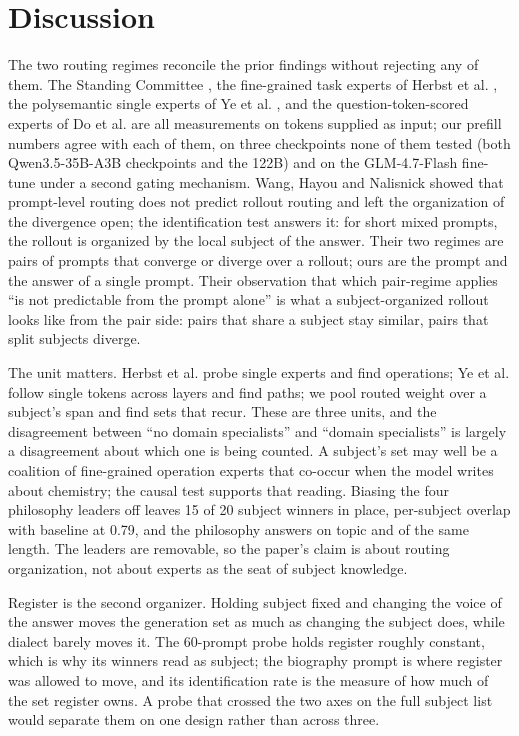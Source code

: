 \documentclass[10pt,twocolumn]{article}
\begin{document}
\section{Discussion}
\label{sec:discussion}

The two routing regimes reconcile the prior findings without rejecting any of them. The Standing Committee \citep{wang2026standingcommittee}, the fine-grained task experts of Herbst et al. \citep{herbst2026expertstrikesback}, the polysemantic single experts of Ye et al. \citep{ye2026polysemantic}, and the question-token-scored experts of Do et al. \citep{do2026domainexperts} are all measurements on tokens supplied as input; our prefill numbers agree with each of them, on three checkpoints none of them tested (both Qwen3.5-35B-A3B checkpoints and the 122B) and on the GLM-4.7-Flash fine-tune under a second gating mechanism. Wang, Hayou and Nalisnick \citep{wang2026myth} showed that prompt-level routing does not predict rollout routing and left the organization of the divergence open; the identification test answers it: for short mixed prompts, the rollout is organized by the local subject of the answer. Their two regimes are pairs of prompts that converge or diverge over a rollout; ours are the prompt and the answer of a single prompt. Their observation that which pair-regime applies ``is not predictable from the prompt alone'' is what a subject-organized rollout looks like from the pair side: pairs that share a subject stay similar, pairs that split subjects diverge.

The unit matters. Herbst et al. probe single experts and find operations; Ye et al. follow single tokens across layers and find paths; we pool routed weight over a subject's span and find sets that recur. These are three units, and the disagreement between ``no domain specialists'' and ``domain specialists'' is largely a disagreement about which one is being counted. A subject's set may well be a coalition of fine-grained operation experts that co-occur when the model writes about chemistry; the causal test supports that reading. Biasing the four philosophy leaders off leaves 15 of 20 subject winners in place, per-subject overlap with baseline at 0.79, and the philosophy answers on topic and of the same length. The leaders are removable, so the paper's claim is about routing organization, not about experts as the seat of subject knowledge.

Register is the second organizer. Holding subject fixed and changing the voice of the answer moves the generation set as much as changing the subject does, while dialect barely moves it. The 60-prompt probe holds register roughly constant, which is why its winners read as subject; the biography prompt is where register was allowed to move, and its identification rate is the measure of how much of the set register owns. A probe that crossed the two axes on the full subject list would separate them on one design rather than across three.
\end{document}
